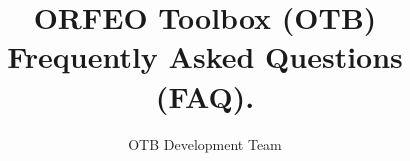 \documentclass[english]{article}
\begin{document}
\title{ORFEO Toolbox (OTB) Frequently Asked Questions (FAQ).}


\author{OTB Development Team}


\maketitle

\tableofcontents



%

%
\end{document}
